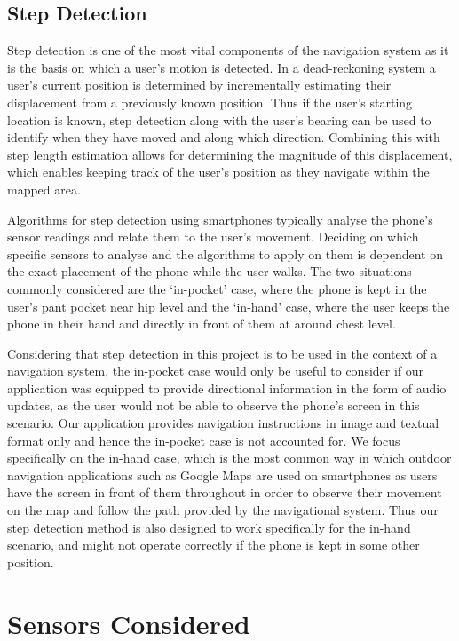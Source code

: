 \documentclass[main.tex]{subfiles}
\begin{document}
\subsection{Step Detection}

Step detection is one of the most vital components of the navigation system as it is the basis on which a user's motion is detected. In a dead-reckoning system a user's current position is determined by incrementally estimating their displacement from a previously known position. Thus if the user's starting location is known, step detection along with the user's bearing can be used to identify when they have moved and along which direction. Combining this with step length estimation allows for determining the magnitude of this displacement, which enables keeping track of the user's position as they navigate within the mapped area. 

Algorithms for step detection using smartphones typically analyse the phone's sensor readings and relate them to the user's movement. Deciding on which specific sensors to analyse and the algorithms to apply on them is dependent on the exact placement of the phone while the user walks. The two situations commonly considered are the `in-pocket' case, where the phone is kept in the user's pant pocket near hip level and the `in-hand' case, where the user keeps the phone in their hand and directly in front of them at around chest level. 

Considering that step detection in this project is to be used in the context of a navigation system, the in-pocket case would only be useful to consider if our application was equipped to provide directional information in the form of audio updates, as the user would not be able to observe the phone's screen in this scenario. Our application provides navigation instructions in image and textual format only and hence the in-pocket case is not accounted for. We focus specifically on the in-hand case, which is the most common way in which outdoor navigation applications such as Google Maps are used on smartphones as users have the screen in front of them throughout in order to observe their movement on the map and follow the path provided by the navigational system. Thus our step detection method is also designed to work specifically for the in-hand scenario, and might not operate correctly if the phone is kept in some other position.  

\section{Sensors Considered}
\end{document}
